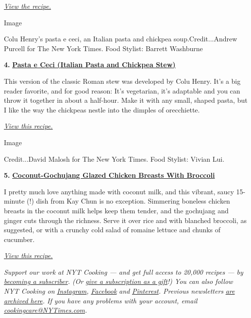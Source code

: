 \href{https://cooking.nytimes3xbfgragh.onion/recipes/1020433-cowboy-caviar}{\emph{View
the recipe.}}

Image

Colu Henry's pasta e ceci, an Italian pasta and chickpea
soup.Credit...Andrew Purcell for The New York Times. Food Stylist:
Barrett Washburne

\textbf{4.}
\href{https://cooking.nytimes3xbfgragh.onion/recipes/1020860-pasta-e-ceci-italian-pasta-and-chickpea-stew}{\textbf{Pasta
e Ceci (Italian Pasta and Chickpea Stew)}}

This version of the classic Roman stew was developed by Colu Henry. It's
a big reader favorite, and for good reason: It's vegetarian, it's
adaptable and you can throw it together in about a half-hour. Make it
with any small, shaped pasta, but I like the way the chickpeas nestle
into the dimples of orecchiette.

\href{https://cooking.nytimes3xbfgragh.onion/recipes/1020860-pasta-e-ceci-italian-pasta-and-chickpea-stew}{\emph{View
this recipe.}}

Image

Credit...David Malosh for The New York Times. Food Stylist: Vivian Lui.

\textbf{5.}
\href{https://cooking.nytimes3xbfgragh.onion/recipes/1020308-coconut-gochujang-glazed-chicken-with-broccoli}{\textbf{Coconut-Gochujang
Glazed Chicken Breasts With Broccoli}}

I pretty much love anything made with coconut milk, and this vibrant,
saucy 15-minute (!) dish from Kay Chun is no exception. Simmering
boneless chicken breasts in the coconut milk helps keep them tender, and
the gochujang and ginger cuts through the richness. Serve it over rice
and with blanched broccoli, as suggested, or with a crunchy cold salad
of romaine lettuce and chunks of cucumber.

\href{https://cooking.nytimes3xbfgragh.onion/recipes/1020308-coconut-gochujang-glazed-chicken-with-broccoli}{\emph{View
this recipe.}}

\emph{Support our work at NYT Cooking --- and get full access to 20,000
recipes --- by}
\href{https://www.nytimes3xbfgragh.onion/subscription/cooking.html?campaignId=788FJ}{\emph{becoming
a subscriber}}\emph{. (Or}
\href{https://www.nytimes3xbfgragh.onion/subscriptions/Multiproduct/cooking_gift.html?campaignId=78X7R}{\emph{give
a subscription as a gift}}\emph{!) You can also follow NYT Cooking on}
\href{https://www.instagram.com/nytcooking}{\emph{Instagram}}\emph{,}
\href{https://www.facebookcorewwwi.onion/nytcooking/}{\emph{Facebook}}
\emph{and}
\href{https://www.pinterest.com/nytcooking/}{\emph{Pinterest}}\emph{.
Previous newsletters}
\href{https://www.nytimes3xbfgragh.onion/column/five-weeknight-dishes}{\emph{are
archived here}}\emph{. If you have any problems with your account,
email}
\href{mailto:cookingcare@NYTimes.com}{\emph{cookingcare@NYTimes.com}}\emph{.}

